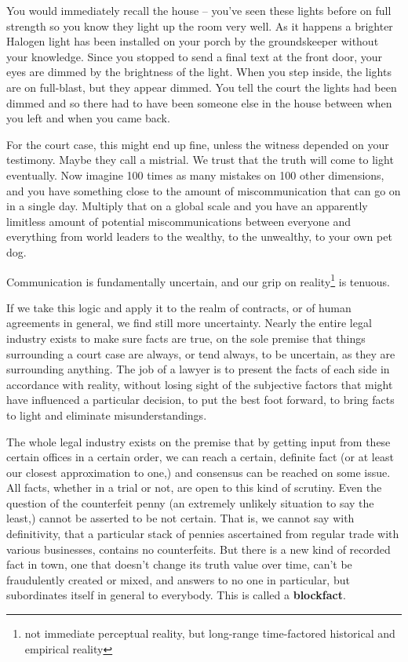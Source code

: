 \documentclass[a4paper,oneside]{article}
\begin{document}
\begin{multicols}{2}
You would immediately recall the house -- you've seen these lights before on full strength so you know they light up the room very well. As it happens a brighter Halogen light has been installed on your porch by the groundskeeper without your knowledge. Since you stopped to send a final text at the front door, your eyes are dimmed by the brightness of the light. When you step inside, the lights are on full-blast, but they appear dimmed. You tell the court the lights had been dimmed and so there had to have been someone else in the house between when you left and when you came back.

For the court case, this might end up fine, unless the witness depended on your testimony. Maybe they call a mistrial. We trust that the truth will come to light eventually. Now imagine 100 times as many mistakes on 100 other dimensions, and you have something close to the amount of miscommunication that can go on in a single day. Multiply that on a global scale and you have an apparently limitless amount of potential miscommunications between everyone and everything from world leaders to  the wealthy, to the unwealthy, to your own pet dog.

Communication is fundamentally uncertain, and our grip on reality\footnote{not immediate perceptual reality, but long-range time-factored historical and empirical reality} is tenuous. 

If we take this logic and apply it to the realm of contracts, or of human agreements in general, we find still more uncertainty. Nearly the entire legal industry exists to make sure facts are true, on the sole premise that things surrounding a court case are always, or tend always, to be uncertain, as they are surrounding anything. The job of a lawyer is to present the facts of each side in accordance with reality, without losing sight of the subjective factors that might have influenced a particular decision, to put the best foot forward, to bring facts to light and eliminate misunderstandings.

The whole legal industry exists on the premise that by getting input from these certain offices in a certain order, we can reach a certain, definite fact (or at least our closest approximation to one,) and consensus can  be reached on some issue. All facts, whether in a trial or not, are open to this kind of scrutiny. Even the question of the counterfeit penny (an extremely unlikely situation to say the least,) cannot be asserted to be not certain. That is, we cannot say with  definitivity, that a particular stack of pennies ascertained from regular trade with various businesses, contains no counterfeits. But there is a new kind of recorded fact in town, one that doesn't change its truth value over time, can't be fraudulently created or mixed, and answers to no one in particular, but subordinates itself in general to everybody. This is called a \textbf{blockfact}.



\end{multicols}
\end{document}

